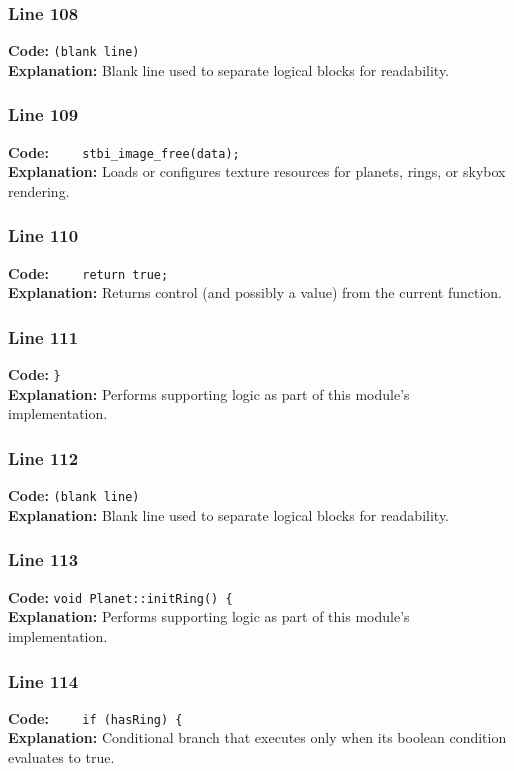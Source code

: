 \documentclass[11pt,a4paper]{article}
\begin{document}
\subsubsection*{Line 108}
\textbf{Code:} \texttt{(blank line)}\\
\textbf{Explanation:} Blank line used to separate logical blocks for readability.

\subsubsection*{Line 109}
\textbf{Code:} \verb|    stbi_image_free(data);|\\
\textbf{Explanation:} Loads or configures texture resources for planets, rings, or skybox rendering.

\subsubsection*{Line 110}
\textbf{Code:} \verb|    return true;|\\
\textbf{Explanation:} Returns control (and possibly a value) from the current function.

\subsubsection*{Line 111}
\textbf{Code:} \verb|}|\\
\textbf{Explanation:} Performs supporting logic as part of this module's implementation.

\subsubsection*{Line 112}
\textbf{Code:} \texttt{(blank line)}\\
\textbf{Explanation:} Blank line used to separate logical blocks for readability.

\subsubsection*{Line 113}
\textbf{Code:} \verb|void Planet::initRing() {|\\
\textbf{Explanation:} Performs supporting logic as part of this module's implementation.

\subsubsection*{Line 114}
\textbf{Code:} \verb|    if (hasRing) {|\\
\textbf{Explanation:} Conditional branch that executes only when its boolean condition evaluates to true.
\end{document}
